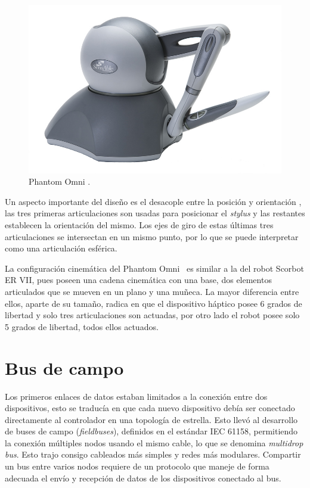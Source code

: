 \begin{figure}[ht]
  \centering
  \includegraphics[scale=.2]{img/cap2/phantom_omni}
  \caption{Phantom Omni \texttrademark.}
  \label{cap2_phantom}
\end{figure}

Un aspecto importante del diseño es el desacople entre la posición y orientación \cite{beckman2007}, las tres primeras articulaciones son usadas para posicionar el \textit{stylus} y las restantes establecen la orientación del mismo. Los ejes de giro de estas últimas tres articulaciones se intersectan en un mismo punto, por lo que se puede interpretar como una articulación esférica.

La configuración cinemática del Phantom Omni \texttrademark \, es similar a la del robot Scorbot ER VII, pues poseen una cadena cinemática con una base, dos elementos articulados que se mueven en un plano y una muñeca. La mayor diferencia entre ellos, aparte de su tamaño, radica en que el dispositivo háptico posee 6 grados de libertad y solo tres articulaciones son actuadas, por otro lado el robot posee solo 5 grados de libertad, todos ellos actuados. 

\section{Bus de campo}

Los primeros enlaces de datos estaban limitados a la conexión entre dos dispositivos, esto se traducía en que cada nuevo dispositivo debía ser conectado directamente al controlador en una topología de estrella. Esto llevó al desarrollo de buses de campo (\textit{fieldbuses}), definidos en el estándar IEC 61158, permitiendo la conexión múltiples nodos usando el mismo cable, lo que se denomina \textit{multidrop bus}. Esto trajo consigo cableados más simples y redes más modulares. Compartir un bus entre varios nodos requiere de un protocolo que maneje de forma adecuada el envío y recepción de datos de los dispositivos conectado al bus.

